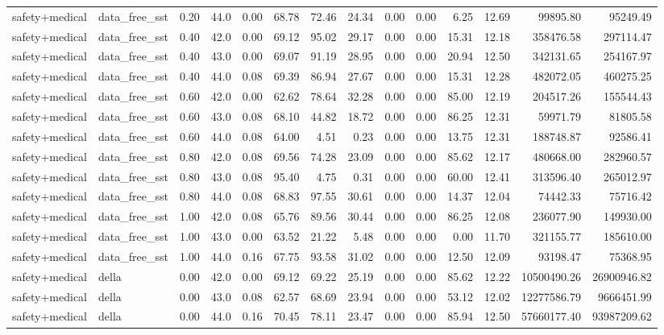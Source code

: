 \documentclass{article}
\begin{document}
\begin{table}[H]
{\begin{tabular}{llllrrrrrrrrrr}
safety+medical & data\_free\_sst & 0.20 & 44.0 & 0.00 & 68.78 & 72.46 & 24.34 & 0.00 & 0.00 & 6.25 & 12.69 & 99895.80 & 95249.49 \\
safety+medical & data\_free\_sst & 0.40 & 42.0 & 0.00 & 69.12 & 95.02 & 29.17 & 0.00 & 0.00 & 15.31 & 12.18 & 358476.58 & 297114.47 \\
safety+medical & data\_free\_sst & 0.40 & 43.0 & 0.00 & 69.07 & 91.19 & 28.95 & 0.00 & 0.00 & 20.94 & 12.50 & 342131.65 & 254167.97 \\
safety+medical & data\_free\_sst & 0.40 & 44.0 & 0.08 & 69.39 & 86.94 & 27.67 & 0.00 & 0.00 & 15.31 & 12.28 & 482072.05 & 460275.25 \\
safety+medical & data\_free\_sst & 0.60 & 42.0 & 0.00 & 62.62 & 78.64 & 32.28 & 0.00 & 0.00 & 85.00 & 12.19 & 204517.26 & 155544.43 \\
safety+medical & data\_free\_sst & 0.60 & 43.0 & 0.08 & 68.10 & 44.82 & 18.72 & 0.00 & 0.00 & 86.25 & 12.31 & 59971.79 & 81805.58 \\
safety+medical & data\_free\_sst & 0.60 & 44.0 & 0.08 & 64.00 & 4.51 & 0.23 & 0.00 & 0.00 & 13.75 & 12.31 & 188748.87 & 92586.41 \\
safety+medical & data\_free\_sst & 0.80 & 42.0 & 0.08 & 69.56 & 74.28 & 23.09 & 0.00 & 0.00 & 85.62 & 12.17 & 480668.00 & 282960.57 \\
safety+medical & data\_free\_sst & 0.80 & 43.0 & 0.08 & 95.40 & 4.75 & 0.31 & 0.00 & 0.00 & 60.00 & 12.41 & 313596.40 & 265012.97 \\
safety+medical & data\_free\_sst & 0.80 & 44.0 & 0.08 & 68.83 & 97.55 & 30.61 & 0.00 & 0.00 & 14.37 & 12.04 & 74442.33 & 75716.42 \\
safety+medical & data\_free\_sst & 1.00 & 42.0 & 0.08 & 65.76 & 89.56 & 30.44 & 0.00 & 0.00 & 86.25 & 12.08 & 236077.90 & 149930.00 \\
safety+medical & data\_free\_sst & 1.00 & 43.0 & 0.00 & 63.52 & 21.22 & 5.48 & 0.00 & 0.00 & 0.00 & 11.70 & 321155.77 & 185610.00 \\
safety+medical & data\_free\_sst & 1.00 & 44.0 & 0.16 & 67.75 & 93.58 & 31.02 & 0.00 & 0.00 & 12.50 & 12.09 & 93198.47 & 75368.95 \\
safety+medical & della & 0.00 & 42.0 & 0.00 & 69.12 & 69.22 & 25.19 & 0.00 & 0.00 & 85.62 & 12.22 & 10500490.26 & 26900946.82 \\
safety+medical & della & 0.00 & 43.0 & 0.08 & 62.57 & 68.69 & 23.94 & 0.00 & 0.00 & 53.12 & 12.02 & 12277586.79 & 9666451.99 \\
safety+medical & della & 0.00 & 44.0 & 0.16 & 70.45 & 78.11 & 23.47 & 0.00 & 0.00 & 85.94 & 12.50 & 57660177.40 & 93987209.62 \\

\end{tabular}}
\end{table}
\end{document}

